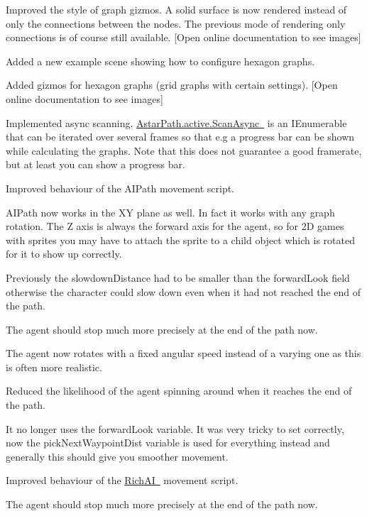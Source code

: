 \begin{DoxyItemize}
\begin{DoxyItemize}
\begin{DoxyItemize}
\begin{DoxyItemize}
\item Improved the style of graph gizmos. A solid surface is now rendered instead of only the connections between the nodes. The previous mode of rendering only connections is of course still available. \mbox{[}Open online documentation to see images\mbox{]}
\item Added a new example scene showing how to configure hexagon graphs.
\item Added gizmos for hexagon graphs (grid graphs with certain settings). \mbox{[}Open online documentation to see images\mbox{]}
\item Implemented async scanning. \mbox{\hyperlink{class_astar_path_ace889f7d491b7100be4db339466880e4}{Astar\+Path.\+active.\+Scan\+Async }} is an I\+Enumerable that can be iterated over several frames so that e.\+g a progress bar can be shown while calculating the graphs. Note that this does not guarantee a good framerate, but at least you can show a progress bar.
\item Improved behaviour of the A\+I\+Path movement script.
\begin{DoxyItemize}
\item A\+I\+Path now works in the XY plane as well. In fact it works with any graph rotation. The Z axis is always the forward axis for the agent, so for 2D games with sprites you may have to attach the sprite to a child object which is rotated for it to show up correctly.
\item Previously the slowdown\+Distance had to be smaller than the forward\+Look field otherwise the character could slow down even when it had not reached the end of the path.
\item The agent should stop much more precisely at the end of the path now.
\item The agent now rotates with a fixed angular speed instead of a varying one as this is often more realistic.
\item Reduced the likelihood of the agent spinning around when it reaches the end of the path.
\item It no longer uses the forward\+Look variable. It was very tricky to set correctly, now the pick\+Next\+Waypoint\+Dist variable is used for everything instead and generally this should give you smoother movement.
\end{DoxyItemize}
\item Improved behaviour of the \mbox{\hyperlink{}{Rich\+AI }} movement script.
\begin{DoxyItemize}
\item The agent should stop much more precisely at the end of the path now.

\end{DoxyItemize}
\end{DoxyItemize}
\end{DoxyItemize}
\end{DoxyItemize}
\end{DoxyItemize}
